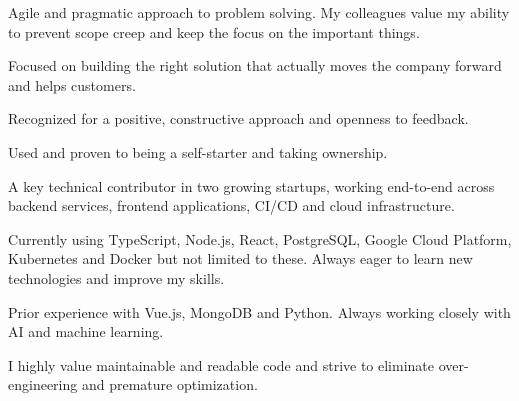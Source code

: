 \documentclass[8pt]{developercv} %
\begin{document}
\vspace{0.5cm}



\begin{minipage}[t]{0.45\textwidth} %
	\vspace{-\baselineskip} %

	Agile and pragmatic approach to problem solving. My colleagues value my ability to prevent scope creep and keep the focus on the important things.

	Focused on building the right solution that actually moves the company forward and helps customers.

	Recognized for a positive, constructive approach and openness to feedback.

	Used and proven to being a self-starter and taking ownership.

\end{minipage}
\hfill %
\begin{minipage}[t]{0.45\textwidth} %
	\vspace{-\baselineskip} %

	A key technical contributor in two growing startups, working end-to-end across backend services, frontend applications, CI/CD and cloud infrastructure.

	Currently using TypeScript, Node.js, React, PostgreSQL, Google Cloud Platform, Kubernetes and Docker but not limited to these. Always eager to learn new technologies and improve my skills.

	Prior experience with Vue.js, MongoDB and Python. Always working closely with AI and machine learning.
	
	I highly value maintainable and readable code and strive to eliminate over-engineering and premature optimization.
\end{minipage}


\end{document}
